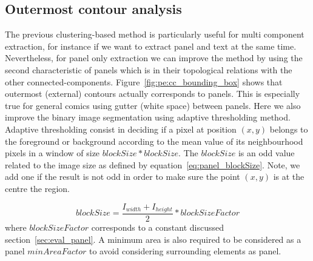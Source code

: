 \subsection{Outermost contour analysis} %
\label{sub:outermost_contour_filtering}
The previous clustering-based method is particularly useful for multi component extraction, for instance if we want to extract panel and text at the same time.
Nevertheless, for panel only extraction we can improve the method by using the second characteristic of panels which is in their topological relations with the other connected-components.
Figure~\ref{fig:pe:cc_bounding_box} shows that outermost (external) contours actually corresponds to panels.
This is especially true for general comics using gutter (white space) between panels.
Here we also improve the binary image segmentation using adaptive thresholding method.
Adaptive thresholding consist in deciding if a pixel at position $(x,y)$ belongs to the foreground or background according to the mean value of its neighbourhood pixels in a window of size $blockSize * blockSize$.
The $blockSize$ is an odd value related to the image size as defined by equation~\ref{eq:panel_blockSize}.
Note, we add one if the result is not odd in order to make sure the point $(x,y)$ is at the centre the region.

\begin{equation}
\label{eq:panel_blockSize}
	blockSize = \frac{I_{width} + I_{height}}{2} * blockSizeFactor
\end{equation}
where $blockSizeFactor$ corresponds to a constant discussed section~\ref{sec:eval_panel}. 
A minimum area is also required to be considered as a panel $minAreaFactor$ to avoid considering surrounding elements as panel.


